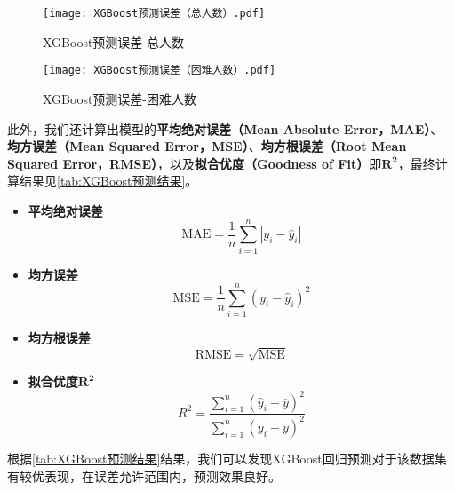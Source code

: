 \documentclass{MathModeling}
\begin{document}
	\begin{figure}[H]
		\centering
		\begin{minipage}{0.48\linewidth}
			\centering
			\texttt{[image: XGBoost预测误差（总人数）.pdf]}
			\caption{XGBoost预测误差-总人数}
			\label{fig:XGBoost预测误差总人数}
		\end{minipage}
		\begin{minipage}{0.48\linewidth}
			\centering
			\texttt{[image: XGBoost预测误差（困难人数）.pdf]}
			\caption{XGBoost预测误差-困难人数}
			\label{fig:XGBoost预测误差困难人数}
		\end{minipage}
	\end{figure}
	此外，我们还计算出模型的\textbf{平均绝对误差（Mean Absolute Error，MAE）}、\textbf{均方误差（Mean Squared Error，MSE）}、\textbf{均方根误差（Root Mean Squared Error，RMSE）}，以及\textbf{拟合优度（Goodness of Fit）}即$\boldsymbol{R^2}$，最终计算结果见\textcolor{blue}{\cref{tab:XGBoost预测结果}}。
	\begin{itemize}
		\item \textbf{平均绝对误差}
			\begin{equation}
			\mathrm{MAE}=\frac{1}{n}\sum_{i=1}^{n}\left|y_{i}-\hat{y}_{i}\right| \label{MAE}
			\end{equation}
		\item \textbf{均方误差}
			\begin{equation}
			\mathrm{MSE}=\frac{1}{n}\sum_{i=1}^{n}\left(y_{i}-\hat{y}_{i}\right)^{2} \label{MSE}
			\end{equation}
		\item \textbf{均方根误差}
			\begin{equation}
			\mathrm{RMSE}=\sqrt{\text{MSE}} \label{RMSE}
			\end{equation}
		\item \textbf{拟合优度}$\boldsymbol{R^2}$
			\begin{equation}
			R^{2}=\frac{\sum\limits_{i=1}^{n}\left(\hat{y}_{i}-\overline{y}\right)^{2}}{\sum\limits_{i=1}^{n}\left(y_{i}-\overline{y}\right)^{2}} \label{R2}
			\end{equation}
	\end{itemize}
  
根据\textcolor{blue}{\cref{tab:XGBoost预测结果}}结果，我们可以发现XGBoost回归预测对于该数据集有较优表现，在误差允许范围内，预测效果良好。
\begin{table}[H]
	\centering
	\caption{XGBoost回归预测结果}
	\label{tab:XGBoost预测结果}
\end{table}
\end{document}
